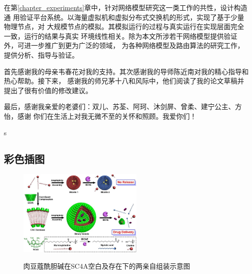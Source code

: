 \documentclass[bachelor,winfonts]{jnuthesis}
\begin{document}
    在第\ref{chapter_experiments}章中，针对网络模型研究这一类工作的共性，设计构造通
    用验证平台系统。以海量虚拟机和虚拟分布式交换机的形式，实现了基于少量物理节点，对
    大规模节点的模拟。其模拟运行的过程与真实运行在实现层面完全一致，运行的结果与真实
    环境线性相关。除为本文所涉若干网络模型提供验证外，可进一步推广到更为广泛的领域，
    为各种网络模型及路由算法的研究工作，提供分析、指导与验证。
    
    \nocite{*}
    

    \begin{acknowledgement}
        首先感谢我的母亲韦春花对我的支持。其次感谢我的导师陈近南对我的精心指导和热心帮助。接下来，
        感谢我的师兄茅十八和风际中，他们阅读了我的论文草稿并提出了很有价值的修改建议。
        
        最后，感谢我亲爱的老婆们：双儿、苏荃、阿珂、沐剑屏、曾柔、建宁公主、方怡，感谢
        你们在生活上对我无微不至的关怀和照顾。我爱你们！
    \end{acknowledgement}
    s
    \begin{appendix}
    \chapter{彩色插图}
    \begin{figure}[htbp]
        \centering
        \includegraphics[width= 0.55\textwidth]{Figure/Ch1-SC4A}\\
        \caption{肉豆蔻酰胆碱在SC4A空白及存在下的两亲自组装示意图}
    \end{figure}
    \end{appendix}
\end{document}

